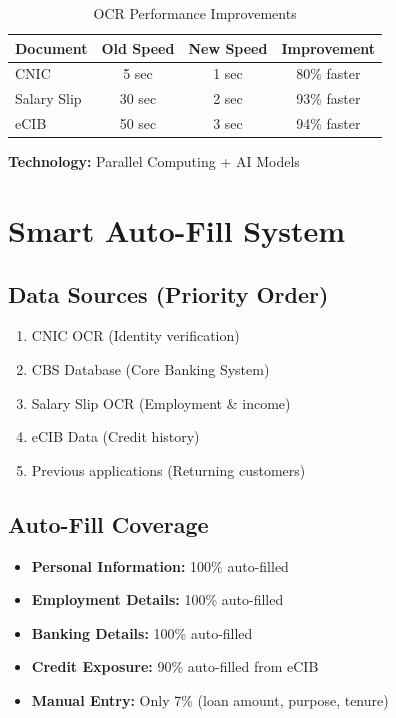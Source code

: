 \documentclass[11pt,a4paper]{article}
\begin{document}
\begin{table}[h]
\centering
\begin{tabular}{@{}lccc@{}}
\toprule
\textbf{Document} & \textbf{Old Speed} & \textbf{New Speed} & \textbf{Improvement} \\ \midrule
CNIC & 5 sec & 1 sec & 80\% faster \\
Salary Slip & 30 sec & 2 sec & 93\% faster \\
eCIB & 50 sec & 3 sec & 94\% faster \\ \bottomrule
\end{tabular}
\caption{OCR Performance Improvements}
\end{table}

\textbf{Technology:} Parallel Computing + AI Models

\newpage

\section{Smart Auto-Fill System}

\subsection{Data Sources (Priority Order)}
\begin{enumerate}
    \item CNIC OCR (Identity verification)
    \item CBS Database (Core Banking System)
    \item Salary Slip OCR (Employment \& income)
    \item eCIB Data (Credit history)
    \item Previous applications (Returning customers)
\end{enumerate}

\subsection{Auto-Fill Coverage}
\begin{itemize}[leftmargin=*]
    \item \textbf{Personal Information:} 100\% auto-filled
    \item \textbf{Employment Details:} 100\% auto-filled
    \item \textbf{Banking Details:} 100\% auto-filled
    \item \textbf{Credit Exposure:} 90\% auto-filled from eCIB
    \item \textbf{Manual Entry:} Only 7\% (loan amount, purpose, tenure)
\end{itemize}
\end{document}
